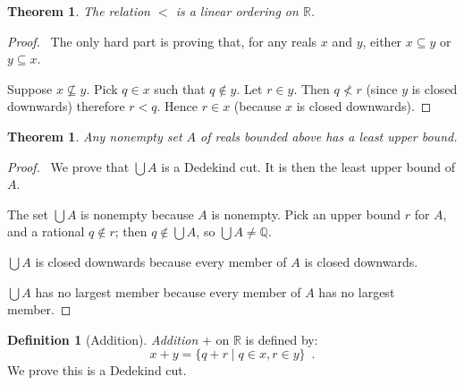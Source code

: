 \documentclass{article}
\let\qed\relax
\newtheorem{theorem}[axiom]{Theorem}
\theoremstyle{definition}
\newtheorem{definition}[axiom]{Definition}
\begin{document}
    \begin{theorem}
        The relation $<$ is a linear ordering on $\mathbb{R}$.
    \end{theorem}

    \begin{proof}
        \pf\ The only hard part is proving that, for any reals $x$ and $y$, either $x \subseteq y$ or
        $y \subseteq x$.

        Suppose $x \nsubseteq y$. Pick $q \in x$ such that $q \notin y$. Let $r \in y$. Then $q \nless r$
        (since $y$ is closed downwards) therefore $r < q$. Hence $r \in x$ (because $x$ is closed downwards).
        \qed
    \end{proof}

    \begin{theorem}
        Any nonempty set $A$ of reals bounded above has a least upper bound.
    \end{theorem}

    \begin{proof}
        \pf\ We prove that $\bigcup A$ is a Dedekind cut. It is then the least upper bound of $A$.

        The set $\bigcup A$ is nonempty because $A$ is nonempty. Pick an upper bound $r$ for $A$, and a
        rational $q \notin r$; then $q \notin \bigcup A$, so $\bigcup A \neq \mathbb{Q}$.

        $\bigcup A$ is closed downwards because every member of $A$ is closed downwards.

        $\bigcup A$ has no largest member because every member of $A$ has no largest member. \qed
    \end{proof}

    \begin{definition}[Addition]
        \emph{Addition} $+$ on $\mathbb{R}$ is defined by:
        \[ x + y = \{ q + r \mid q \in x, r \in y \} \enspace .\]
        We prove this is a Dedekind cut.
    \end{definition}
\end{document}
